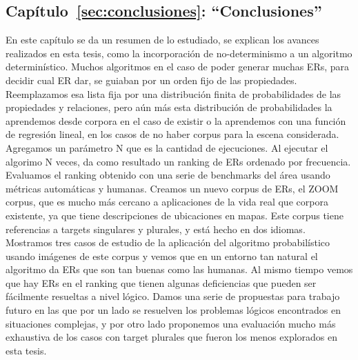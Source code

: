 \subsection{Cap\'itulo~\ref{sec:conclusiones}: ``Conclusiones''} En este cap\'itulo se da un resumen de lo estudiado, se explican los avances realizados en esta tesis, como la incorporaci\'on de no-determinismo a un algoritmo determin\'istico. Muchos algoritmos en el caso de poder generar muchas ERs, para decidir cual ER dar, se guiaban por un orden fijo de las propiedades. Reemplazamos esa lista fija por una distribuci\'on finita de probabilidades de las propiedades y relaciones, pero a\'un m\'as esta distribuci\'on de probabilidades la aprendemos desde corpora en el caso de existir o la aprendemos con una funci\'on de regresi\'on lineal, en los casos de no haber corpus para la escena considerada. Agregamos un par\'ametro N que es la cantidad de ejecuciones. Al ejecutar el algorimo N veces, da como resultado un ranking de ERs ordenado por frecuencia. Evaluamos el ranking obtenido con una serie de benchmarks del \'area usando m\'etricas autom\'aticas y humanas. Creamos un nuevo corpus de ERs, el ZOOM corpus, que es mucho m\'as cercano a aplicaciones de la vida real que corpora existente, ya que tiene descripciones de ubicaciones en mapas. Este corpus tiene referencias a targets singulares y plurales, y est\'a hecho en dos idiomas. Mostramos tres casos de estudio de la aplicaci\'on del algoritmo probabil\'istico usando im\'agenes de este corpus y vemos que en un entorno tan natural el algoritmo da ERs que son tan buenas como las humanas. Al mismo tiempo vemos que hay ERs en el ranking que tienen algunas deficiencias que pueden ser f\'acilmente resueltas a nivel l\'ogico. Damos una serie de propuestas para trabajo futuro en las que por un lado se resuelven los problemas l\'ogicos encontrados en situaciones complejas, y por otro lado proponemos una evaluaci\'on mucho m\'as exhaustiva de los casos con target plurales que fueron los menos explorados en esta tesis.


